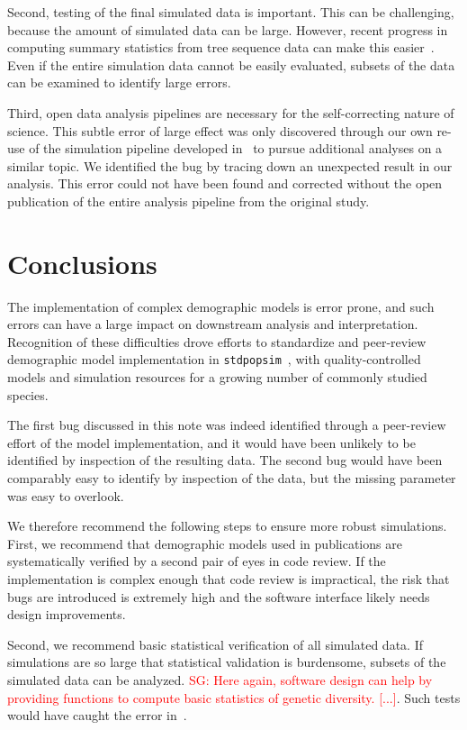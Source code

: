 \documentclass{article}
\newcommand{\stdpopsim}[0]{\texttt{stdpopsim}}
\newcommand{\sgcomment}[1]{{\textcolor{red}{SG: #1}}}
\begin{document}
Second, testing of the final simulated data is important. This can be challenging,
because the amount of simulated data can be large. However, recent progress in
computing summary statistics from tree sequence data can make this
easier~\citep{ralph2020efficiently}.
Even if the entire simulation data cannot be easily evaluated, subsets of the data
can be examined to identify large errors.

Third, open data analysis pipelines are necessary for the self-correcting nature of science.
This subtle error of large effect was only discovered through our own re-use of
the simulation pipeline developed in~\citep{martin2017human} to pursue
additional analyses on a similar topic. We identified the bug by tracing down an unexpected
result in our analysis. This error could not have been found and corrected without the open
publication of the entire analysis pipeline from the original study.

\section{Conclusions}

The implementation of complex demographic models is error prone, and such errors can 
have a large impact on downstream analysis and interpretation. 
Recognition of these difficulties drove efforts to standardize and peer-review demographic model
implementation in \stdpopsim~\citep{adrion2019community}, with quality-controlled
models and simulation resources for a growing number of commonly studied species. 

The first bug discussed in this note was indeed identified through a peer-review effort of the 
model implementation,  and it would have been unlikely to be identified by inspection of the 
resulting data. The second bug would have been comparably easy to identify by inspection of the data, 
but the missing parameter was easy to overlook. 

We therefore recommend the following steps to ensure more robust simulations.
First, we recommend that demographic models used in publications 
are systematically verified by a second pair of eyes in code review. If the implementation is complex enough
that code review is impractical, the risk that bugs are introduced is extremely high and the software 
interface likely needs design improvements. 

Second, we recommend basic statistical verification of all simulated data. If simulations are so large that
statistical validation is burdensome, subsets of the simulated data can be analyzed. 
\sgcomment{Here again, software design can help by providing functions to compute 
basic statistics of genetic diversity. [...]}. Such tests would have caught the error in~\citet{martin2017human}.
\end{document}
